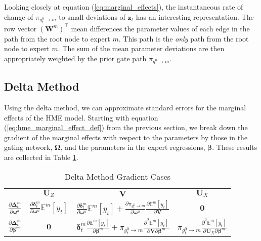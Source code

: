 \documentclass[12pt]{article}
\newcommand{\gateprod}[2]{\pi_{#1 \longrightarrow #2}}
\newcommand{\Eym}{\mathbb{E}^{m} \left[ y_{t} \right]}
\begin{document}
Looking closely at equation (\ref{eq:marginal_effects}), the instantaneous rate
of change of $\gateprod{g^{0}_{t}}{m}$ to small deviations of $\boldsymbol{z}_{t}$
has an interesting representation. The row vector $( \boldsymbol{W}^{m} )^{\top}$
mean differences the parameter values of each edge in the path from the
root node to expert $m$. This path is the \textit{only} path from the root
node to expert $m$. The sum of the mean parameter deviations are then appropriately
weighted by the prior gate path $\gateprod{g^{0}}{m}$.


\subsection{Delta Method}

Using the delta method, we can approximate standard
errors for the marginal effects of the HME model. Starting with equation
(\ref{eq:hme_marginal_effect_def}) from the previous section, we break down
the gradient of the marginal effects with respect to the parameters by those 
in the gating network, $\boldsymbol{\Omega}$, and the parameters in the
expert regressions, $\boldsymbol{\beta}$. These results are collected in Table
 \ref{tbl:delta_method_gradients}.

 \bigskip

\begin{table}
  \begin{center}
    \begin{tabular}{| l | c c c |}
    \hline
                                                                                    & \underline{$\boldsymbol{U}_{Z}$}                                                            & \underline{$\boldsymbol{V}$}                                                                                                                                                                                           & \underline{$\boldsymbol{U}_{X}$}   \\ [2ex]
    $\frac{\partial \boldsymbol{\Delta}_{t}^{m}}{\partial \boldsymbol{\omega}^{a}}$ & $\frac{\partial \boldsymbol{\delta}^{m}_{t}}{\partial \boldsymbol{\omega}^{a}} \Eym$        & $\frac{\partial \boldsymbol{\delta}^{m}_{t}}{\partial \boldsymbol{\omega}^{a}} \Eym + \frac{\partial \gateprod{g^{0}_{t}}{m}}{\partial \boldsymbol{\omega}^{a}}  \frac{\partial \Eym}{{\partial \boldsymbol{V}}}$  & $\boldsymbol{0}$                   \\ [2ex]
    $\frac{\partial \boldsymbol{\Delta}_{t}^{m}}{\partial \boldsymbol{\beta}^{m}}$  & $\boldsymbol{0}$                                                                            & $\boldsymbol{\delta}^{m}_{t} \frac{\partial \Eym}{\partial \boldsymbol{\beta}^{m}} + \gateprod{g^{0}_{t}}{m}   \frac{\partial^{2} \Eym}{\partial \boldsymbol{V} \partial \boldsymbol{\beta}^{m}}$    & $\gateprod{g^{0}_{t}}{m}  \frac{\partial^{2} \Eym}{\partial \boldsymbol{U}_{X} \partial \boldsymbol{\beta}^{m}}$  \\ [1ex]
    \hline
    \end{tabular}
  \caption{\label{tbl:delta_method_gradients} Delta Method Gradient Cases}
  \end{center}
\end{table}
\end{document}
